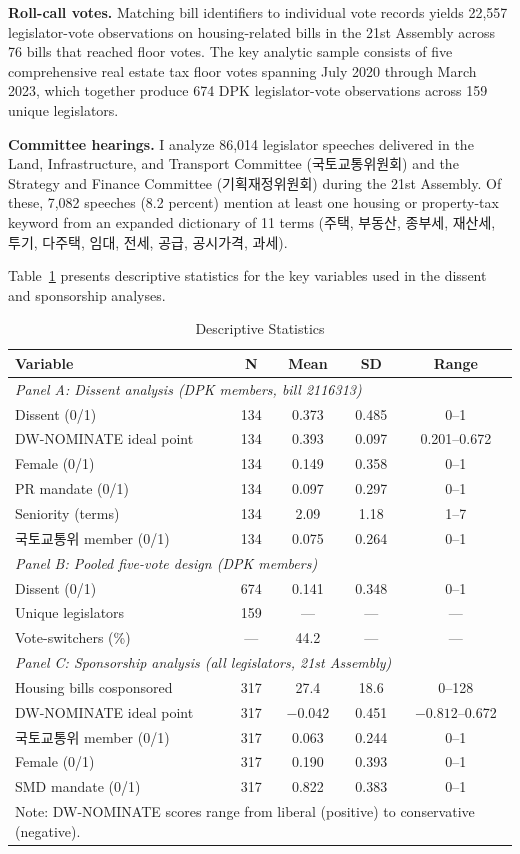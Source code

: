 \documentclass[11pt]{article}
\begin{document}
\textbf{Roll-call votes.} Matching bill identifiers to individual vote records yields 22,557 legislator-vote observations on housing-related bills in the 21st Assembly across 76 bills that reached floor votes. The key analytic sample consists of five comprehensive real estate tax floor votes spanning July 2020 through March 2023, which together produce 674 DPK legislator-vote observations across 159 unique legislators.

\textbf{Committee hearings.} I analyze 86,014 legislator speeches delivered in the Land, Infrastructure, and Transport Committee (국토교통위원회) and the Strategy and Finance Committee (기획재정위원회) during the 21st Assembly. Of these, 7,082 speeches (8.2 percent) mention at least one housing or property-tax keyword from an expanded dictionary of 11 terms (주택, 부동산, 종부세, 재산세, 투기, 다주택, 임대, 전세, 공급, 공시가격, 과세).

Table~\ref{tab:desc} presents descriptive statistics for the key variables used in the dissent and sponsorship analyses.

\begin{table}[H]
\centering
\caption{Descriptive Statistics}
\label{tab:desc}
\begin{tabular}{lcccc}
\toprule
Variable & N & Mean & SD & Range \\
\midrule
\multicolumn{5}{l}{\textit{Panel A: Dissent analysis (DPK members, bill 2116313)}} \\
Dissent (0/1) & 134 & 0.373 & 0.485 & 0--1 \\
DW-NOMINATE ideal point & 134 & 0.393 & 0.097 & 0.201--0.672 \\
Female (0/1) & 134 & 0.149 & 0.358 & 0--1 \\
PR mandate (0/1) & 134 & 0.097 & 0.297 & 0--1 \\
Seniority (terms) & 134 & 2.09 & 1.18 & 1--7 \\
국토교통위 member (0/1) & 134 & 0.075 & 0.264 & 0--1 \\[3pt]
\multicolumn{5}{l}{\textit{Panel B: Pooled five-vote design (DPK members)}} \\
Dissent (0/1) & 674 & 0.141 & 0.348 & 0--1 \\
Unique legislators & 159 & --- & --- & --- \\
Vote-switchers (\%) & --- & 44.2 & --- & --- \\[3pt]
\multicolumn{5}{l}{\textit{Panel C: Sponsorship analysis (all legislators, 21st Assembly)}} \\
Housing bills cosponsored & 317 & 27.4 & 18.6 & 0--128 \\
DW-NOMINATE ideal point & 317 & $-0.042$ & 0.451 & $-0.812$--0.672 \\
국토교통위 member (0/1) & 317 & 0.063 & 0.244 & 0--1 \\
Female (0/1) & 317 & 0.190 & 0.393 & 0--1 \\
SMD mandate (0/1) & 317 & 0.822 & 0.383 & 0--1 \\
\bottomrule
\multicolumn{5}{l}{\footnotesize Note: DW-NOMINATE scores range from liberal (positive) to conservative (negative).}
\end{tabular}
\end{table}
\end{document}
